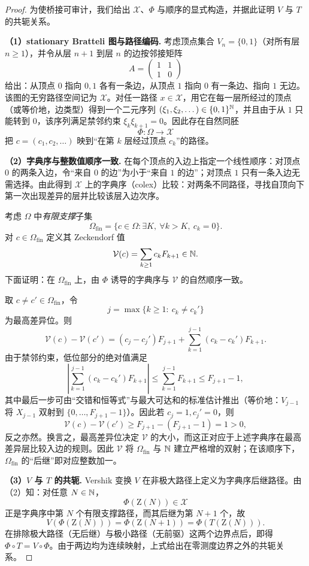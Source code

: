 \begin{proof}
为使桥接可审计，我们给出 $\mathcal{X}$、$\Phi$ 与顺序的显式构造，并据此证明 $V$ 与 $T$ 的共轭关系。

\textbf{（1）stationary Bratteli 图与路径编码.}
考虑顶点集合 $V_n=\{0,1\}$（对所有层 $n\ge 1$），并令从层 $n+1$ 到层 $n$ 的边按邻接矩阵
$$
A=\begin{pmatrix}1&1\\1&0\end{pmatrix}
$$
给出：从顶点 $0$ 指向 $0,1$ 各有一条边，从顶点 $1$ 指向 $0$ 有一条边、指向 $1$ 无边。该图的无穷路径空间记为 $\mathcal{X}$。对任一路径 $x\in\mathcal{X}$，用它在每一层所经过的顶点（或等价地，边类型）得到一个二元序列 $(\xi_1,\xi_2,\dots)\in\{0,1\}^{\mathbb{N}}$，并且由于从 $1$ 只能转到 $0$，该序列满足禁邻约束 $\xi_k\xi_{k+1}=0$。因此存在自然同胚
$$
\Phi:\Omega\to\mathcal{X}
$$
把 $c=(c_1,c_2,\dots)$ 映到“在第 $k$ 层经过顶点 $c_k$”的路径。

\textbf{（2）字典序与整数值顺序一致.}
在每个顶点的入边上指定一个线性顺序：对顶点 $0$ 的两条入边，令“来自 $0$ 的边”为小于“来自 $1$ 的边”；对顶点 $1$ 只有一条入边无需选择。由此得到 $\mathcal{X}$ 上的字典序（colex）比较：对两条不同路径，寻找自顶向下第一次出现差异的层并比较该层入边次序。

考虑 $\Omega$ 中\emph{有限支撑}子集
$$
\Omega_{\mathrm{fin}}=\{c\in\Omega:\exists K,\ \forall k>K,\ c_k=0\}.
$$
对 $c\in\Omega_{\mathrm{fin}}$ 定义其 Zeckendorf 值
$$
\mathcal{V}(c)=\sum_{k\ge 1} c_kF_{k+1}\in\mathbb{N}.
$$
下面证明：在 $\Omega_{\mathrm{fin}}$ 上，由 $\Phi$ 诱导的字典序与 $\mathcal{V}$ 的自然顺序一致。

取 $c\ne c'\in\Omega_{\mathrm{fin}}$，令
$$
j=\max\{k\ge 1:\ c_k\ne c_k'\}
$$
为最高差异位。则
$$
\mathcal{V}(c)-\mathcal{V}(c')=(c_j-c_j')F_{j+1}+\sum_{k=1}^{j-1}(c_k-c_k')F_{k+1}.
$$
由于禁邻约束，低位部分的绝对值满足
$$
\left|\sum_{k=1}^{j-1}(c_k-c_k')F_{k+1}\right|
\le \sum_{k=1}^{j-1} F_{k+1}
\le F_{j+1}-1,
$$
其中最后一步可由“交错和恒等式”与最大可达和的标准估计推出（等价地：$V_{j-1}$ 将 $X_{j-1}$ 双射到 $\{0,\dots,F_{j+1}-1\}$）。因此若 $c_j=1,c_j'=0$，则
$$
\mathcal{V}(c)-\mathcal{V}(c')\ge F_{j+1}-(F_{j+1}-1)=1>0,
$$
反之亦然。换言之，最高差异位决定 $\mathcal{V}$ 的大小，而这正对应于上述字典序在最高差异层比较入边的规则。因此 $\mathcal{V}$ 将 $\Omega_{\mathrm{fin}}$ 与 $\mathbb{N}$ 建立严格增的双射；在该顺序下，$\Omega_{\mathrm{fin}}$ 的“后继”即对应整数加一。

\textbf{（3）$V$ 与 $T$ 的共轭.}
Vershik 变换 $V$ 在非极大路径上定义为字典序后继路径。由（2）知：对任意 $N\in\mathbb{N}$，
$$
\Phi(\mathrm{Z}(N))\in\mathcal{X}
$$
正是字典序中第 $N$ 个有限支撑路径，而其后继为第 $N+1$ 个，故
$$
V(\Phi(\mathrm{Z}(N)))=\Phi(\mathrm{Z}(N+1))=\Phi(T(\mathrm{Z}(N))).
$$
在排除极大路径（无后继）与极小路径（无前驱）这两个边界点后，即得 $\Phi\circ T=V\circ\Phi$。由于两边均为连续映射，上式给出在零测度边界之外的共轭关系。
\end{proof}

